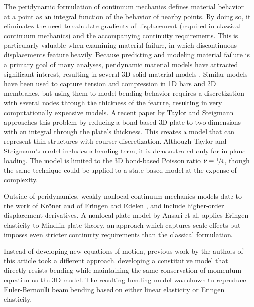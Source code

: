 \documentclass[preprint,review,12pt]{elsarticle}
\begin{document}
The peridynamic formulation of continuum mechanics defines material behavior at a point as an integral function of the behavior of nearby points. By doing so, it eliminates the need to calculate gradients of displacement (required in classical continuum mechanics) and the accompanying continuity requirements. This is particularly valuable when examining material failure, in which discontinuous displacements feature heavily. Because predicting and modeling material failure is a primary goal of many analyses, peridynamic material models have attracted significant interest, resulting in several 3D solid material models \cite{silling2007peridynamic, silling2005meshfree, gerstle2007peridynamic}. Similar models have been used to capture tension and compression in 1D bars\cite{silling2003deformation} and 2D membranes\cite{silling2005peridynamic}, but using them to model bending behavior requires a discretization with several nodes through the thickness of the feature, resulting in very computationally expensive models. A recent paper by Taylor and Steigmann \cite{taylor2013two} approaches this problem by reducing a bond based 3D plate to two dimensions with an integral through the plate's thickness.  This creates a model that can represent thin structures with courser discretization. Although Taylor and Steigmann's model includes a bending term, it is demonstrated only for in-plane loading. The model is limited to the 3D bond-based Poisson ratio \(\nu=\sfrac{1}{4}\), though the same technique could be applied to a state-based model at the expense of complexity.

 Outside of peridynamics, weakly nonlocal continuum mechanics models date to the work of Kr\"oner \cite{kroner1967elasticity} and of Eringen and Edelen \cite{eringen1972nonlocal}, and include higher-order displacement derivatives.  A nonlocal plate model by Ansari et al. \cite{ansari2010nonlocal} applies Eringen elasticity to Mindlin plate theory, an approach which captures scale effects but imposes even stricter continuity requirements than the classical formulation.

Instead of developing new equations of motion, previous work by the authors of this article took a different approach, developing a constitutive model that directly resists bending while maintaining the same conservation of momentum equation as the 3D model.  The resulting bending model was shown to reproduce Euler-Bernoulli beam bending based on either linear elasticity or Eringen elasticity.
\end{document}
